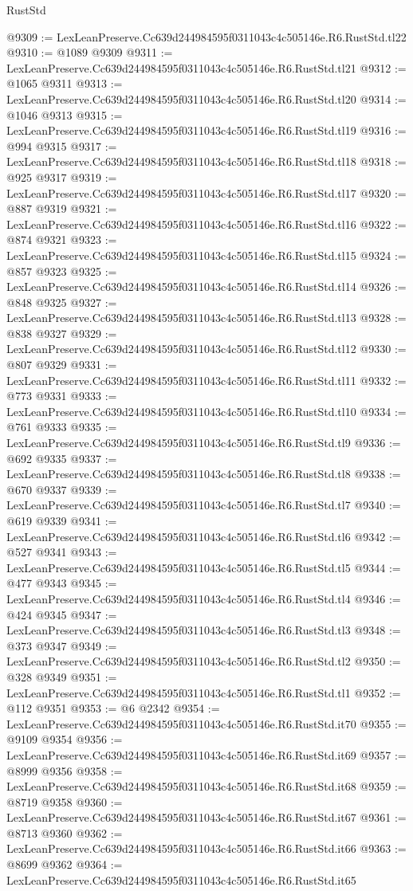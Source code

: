 \begin{lexlean}{RustStd}
\begin{coremodule}
@9309 := LexLeanPreserve.Cc639d244984595f0311043c4c505146e.R6.RustStd.tl22
@9310 := @1089 @9309
@9311 := LexLeanPreserve.Cc639d244984595f0311043c4c505146e.R6.RustStd.tl21
@9312 := @1065 @9311
@9313 := LexLeanPreserve.Cc639d244984595f0311043c4c505146e.R6.RustStd.tl20
@9314 := @1046 @9313
@9315 := LexLeanPreserve.Cc639d244984595f0311043c4c505146e.R6.RustStd.tl19
@9316 := @994 @9315
@9317 := LexLeanPreserve.Cc639d244984595f0311043c4c505146e.R6.RustStd.tl18
@9318 := @925 @9317
@9319 := LexLeanPreserve.Cc639d244984595f0311043c4c505146e.R6.RustStd.tl17
@9320 := @887 @9319
@9321 := LexLeanPreserve.Cc639d244984595f0311043c4c505146e.R6.RustStd.tl16
@9322 := @874 @9321
@9323 := LexLeanPreserve.Cc639d244984595f0311043c4c505146e.R6.RustStd.tl15
@9324 := @857 @9323
@9325 := LexLeanPreserve.Cc639d244984595f0311043c4c505146e.R6.RustStd.tl14
@9326 := @848 @9325
@9327 := LexLeanPreserve.Cc639d244984595f0311043c4c505146e.R6.RustStd.tl13
@9328 := @838 @9327
@9329 := LexLeanPreserve.Cc639d244984595f0311043c4c505146e.R6.RustStd.tl12
@9330 := @807 @9329
@9331 := LexLeanPreserve.Cc639d244984595f0311043c4c505146e.R6.RustStd.tl11
@9332 := @773 @9331
@9333 := LexLeanPreserve.Cc639d244984595f0311043c4c505146e.R6.RustStd.tl10
@9334 := @761 @9333
@9335 := LexLeanPreserve.Cc639d244984595f0311043c4c505146e.R6.RustStd.tl9
@9336 := @692 @9335
@9337 := LexLeanPreserve.Cc639d244984595f0311043c4c505146e.R6.RustStd.tl8
@9338 := @670 @9337
@9339 := LexLeanPreserve.Cc639d244984595f0311043c4c505146e.R6.RustStd.tl7
@9340 := @619 @9339
@9341 := LexLeanPreserve.Cc639d244984595f0311043c4c505146e.R6.RustStd.tl6
@9342 := @527 @9341
@9343 := LexLeanPreserve.Cc639d244984595f0311043c4c505146e.R6.RustStd.tl5
@9344 := @477 @9343
@9345 := LexLeanPreserve.Cc639d244984595f0311043c4c505146e.R6.RustStd.tl4
@9346 := @424 @9345
@9347 := LexLeanPreserve.Cc639d244984595f0311043c4c505146e.R6.RustStd.tl3
@9348 := @373 @9347
@9349 := LexLeanPreserve.Cc639d244984595f0311043c4c505146e.R6.RustStd.tl2
@9350 := @328 @9349
@9351 := LexLeanPreserve.Cc639d244984595f0311043c4c505146e.R6.RustStd.tl1
@9352 := @112 @9351
@9353 := @6 @2342
@9354 := LexLeanPreserve.Cc639d244984595f0311043c4c505146e.R6.RustStd.it70
@9355 := @9109 @9354
@9356 := LexLeanPreserve.Cc639d244984595f0311043c4c505146e.R6.RustStd.it69
@9357 := @8999 @9356
@9358 := LexLeanPreserve.Cc639d244984595f0311043c4c505146e.R6.RustStd.it68
@9359 := @8719 @9358
@9360 := LexLeanPreserve.Cc639d244984595f0311043c4c505146e.R6.RustStd.it67
@9361 := @8713 @9360
@9362 := LexLeanPreserve.Cc639d244984595f0311043c4c505146e.R6.RustStd.it66
@9363 := @8699 @9362
@9364 := LexLeanPreserve.Cc639d244984595f0311043c4c505146e.R6.RustStd.it65

\end{coremodule}
\end{lexlean}
